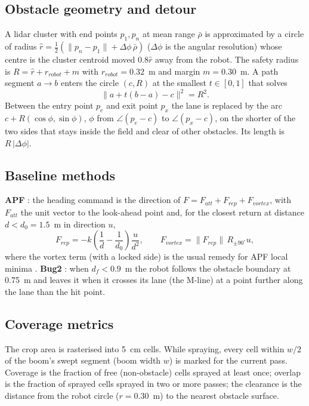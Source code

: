 \documentclass[12pt,a4paper]{article}
\begin{document}
\subsection{Obstacle geometry and detour}
A lidar cluster with end points $p_1,p_n$ at mean range $\bar\rho$ is approximated by a circle of radius $\hat r = \tfrac12(\|p_n-p_1\| + \Delta\phi\,\bar\rho)$ ($\Delta\phi$ is the angular resolution) whose centre is the cluster centroid moved $0.8\hat r$ away from the robot. The safety radius is $R=\hat r + r_{robot} + m$ with $r_{robot}=0.32$~m and margin $m=0.30$~m. A path segment $a\!\to\!b$ enters the circle $(c,R)$ at the smallest $t\in[0,1]$ that solves
\begin{equation}
\|a + t(b-a) - c\|^2 = R^2 .
\end{equation}
Between the entry point $p_e$ and exit point $p_x$ the lane is replaced by the arc $c + R(\cos\phi,\sin\phi)$, $\phi$ from $\angle(p_e-c)$ to $\angle(p_x-c)$, on the shorter of the two sides that stays inside the field and clear of other obstacles. Its length is $R\,|\Delta\phi|$.

\subsection{Baseline methods}
\textbf{APF} \cite{khatib1986}: the heading command is the direction of $F = F_{att} + F_{rep} + F_{vortex}$, with $F_{att}$ the unit vector to the look-ahead point and, for the closest return at distance $d<d_0=1.5$~m in direction $u$,
\begin{equation}
F_{rep} = -k\left(\frac1d-\frac1{d_0}\right)\frac{u}{d^2}, \qquad F_{vortex} = \|F_{rep}\|\, R_{\pm 90^\circ} u ,
\end{equation}
where the vortex term (with a locked side) is the usual remedy for APF local minima \cite{koren1991}. \textbf{Bug2} \cite{lumelsky1987}: when $d_f<0.9$~m the robot follows the obstacle boundary at 0.75~m and leaves it when it crosses its lane (the M-line) at a point further along the lane than the hit point.

\subsection{Coverage metrics}
The crop area is rasterised into 5~cm cells. While spraying, every cell within $w/2$ of the boom's swept segment (boom width $w$) is marked for the current pass. Coverage is the fraction of free (non-obstacle) cells sprayed at least once; overlap is the fraction of sprayed cells sprayed in two or more passes; the clearance is the distance from the robot circle ($r=0.30$~m) to the nearest obstacle surface.
\end{document}
